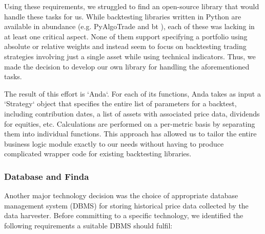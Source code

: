 \documentclass[main.tex]{subfiles}
\begin{document}
Using these requirements, we struggled to find an open-source library that would handle these tasks for us. While backtesting libraries written in Python are available in abundance (e.g. PyAlgoTrade \cite{PyAlgoTrade} and bt \cite{bt}), each of these was lacking in at least one critical aspect. None of them support specifying a portfolio using absolute or relative weights and instead seem to focus on backtesting trading strategies involving just a single asset while using technical indicators. Thus, we made the decision to develop our own library for handling the aforementioned tasks.

The result of this effort is `Anda`. For each of its functions, Anda takes as input a `Strategy` object that specifies the entire list of parameters for a backtest, including contribution dates, a list of assets with associated price data, dividends for equities, etc. Calculations are performed on a per-metric basis by separating them into individual functions.
This approach has allowed us to tailor the entire business logic module exactly to our needs without having to produce complicated wrapper code for existing backtesting libraries.

\subsubsection{Database and Finda}
\label{Finda}

Another major technology decision was the choice of appropriate database management system (DBMS) for storing historical price data collected by the data harvester. Before committing to a specific technology, we identified the following requirements a suitable DBMS should fulfil:
\end{document}
